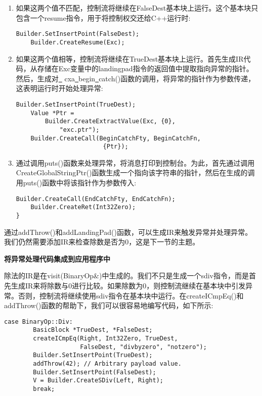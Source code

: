 \begin{enumerate}
\item 如果这两个值不匹配，控制流将继续在FalseDest基本块上运行。这个基本块只包含一个resume指令，用于将控制权交还给C++运行时:
\begin{lstlisting}[caption={}]
	Builder.SetInsertPoint(FalseDest);
	Builder.CreateResume(Exc);
\end{lstlisting}

\item 如果这两个值相等，控制流将继续在TrueDest基本块上运行。首先生成IR代码，从存储在Exc变量中的landingpad指令的返回值中提取指向异常的指针。然后，生成对\underline{~} cxa\underline{~}begin\underline{~}catch()函数的调用，将异常的指针作为参数传递，这表明运行时开始处理异常:
\begin{lstlisting}[caption={}]
	Builder.SetInsertPoint(TrueDest);
	Value *Ptr =
		Builder.CreateExtractValue(Exc, {0}, 
			"exc.ptr");
	Builder.CreateCall(BeginCatchFty, BeginCatchFn,
						{Ptr});
\end{lstlisting}

\item 通过调用puts()函数来处理异常，将消息打印到控制台。为此，首先通过调用CreateGlobalString\allowbreak Ptr()函数生成一个指向该字符串的指针，然后在生成的调用puts()函数中将该指针作为参数传入:
\begin{lstlisting}[caption={}]
	Builder.CreateCall(EndCatchFty, EndCatchFn);
	Builder.CreateRet(Int32Zero);
}
\end{lstlisting}
\end{enumerate}

通过addThrow()和addLandingPad()函数，可以生成IR来触发异常并处理异常。我们仍然需要添加IR来检查除数是否为0，这是下一节的主题。\par

\hspace*{\fill} \par %
\textbf{将异常处理代码集成到应用程序中}

除法的IR是在visit(BinaryOp\&)中生成的。我们不只是生成一个sdiv指令，而是首先生成IR来将除数与0进行比较。如果除数为0，则控制流继续在基本块中引发异常。否则，控制流将继续使用sdiv指令在基本块中运行。在createICmpEq()和addThrow()函数的帮助下，我们可以很容易地编写代码，如下所示:\par

\begin{lstlisting}[caption={}]
	case BinaryOp::Div:
		BasicBlock *TrueDest, *FalseDest;
		createICmpEq(Right, Int32Zero, TrueDest,
					 FalseDest, "divbyzero", "notzero");
		Builder.SetInsertPoint(TrueDest);
		addThrow(42); // Arbitrary payload value.
		Builder.SetInsertPoint(FalseDest);
		V = Builder.CreateSDiv(Left, Right);
		break;
\end{lstlisting}

